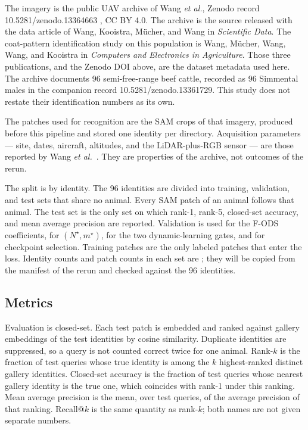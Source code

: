 The imagery is the public UAV archive of Wang \emph{et al.}, Zenodo record 10.5281/zenodo.13364663 \cite{wang2024uavlidar}, CC BY 4.0. The archive is the source released with the data article of Wang, Kooistra, M\"ucher, and Wang \cite{wang2025datadescriptor} in \emph{Scientific Data}. The coat-pattern identification study on this population is Wang, M\"ucher, Wang, Wang, and Kooistra \cite{wang2025coatdml} in \emph{Computers and Electronics in Agriculture}. Those three publications, and the Zenodo DOI above, are the dataset metadata used here. The archive documents 96 semi-free-range beef cattle, recorded as 96 Simmental males in the companion record 10.5281/zenodo.13361729. This study does not restate their identification numbers as its own.

The patches used for recognition are the SAM crops of that imagery, produced before this pipeline and stored one identity per directory. Acquisition parameters --- site, dates, aircraft, altitudes, and the LiDAR-plus-RGB sensor --- are those reported by Wang \emph{et al.}~\cite{wang2025datadescriptor}. They are properties of the archive, not outcomes of the rerun.

The split is by identity. The 96 identities are divided into training, validation, and test sets that share no animal. Every SAM patch of an animal follows that animal. The test set is the only set on which rank-1, rank-5, closed-set accuracy, and mean average precision are reported. Validation is used for the F-ODS coefficients, for $(N^{\star},m^{\star})$, for the two dynamic-learning gates, and for checkpoint selection. Training patches are the only labeled patches that enter the loss. Identity counts and patch counts in each set are \pending{}; they will be copied from the manifest of the rerun and checked against the 96 identities.

\subsection{Metrics}
\label{sec:metrics}

Evaluation is closed-set. Each test patch is embedded and ranked against gallery embeddings of the test identities by cosine similarity. Duplicate identities are suppressed, so a query is not counted correct twice for one animal. Rank-$k$ is the fraction of test queries whose true identity is among the $k$ highest-ranked distinct gallery identities. Closed-set accuracy is the fraction of test queries whose nearest gallery identity is the true one, which coincides with rank-1 under this ranking. Mean average precision is the mean, over test queries, of the average precision of that ranking. Recall@$k$ is the same quantity as rank-$k$; both names are not given separate numbers.

